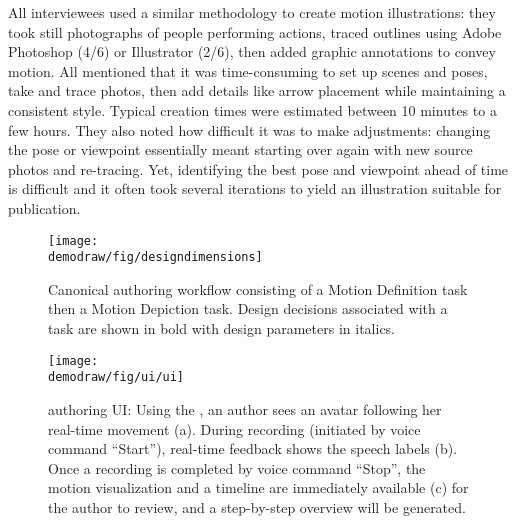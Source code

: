 %
All interviewees used a similar methodology to create motion illustrations: they took still photographs of people performing actions, traced outlines using Adobe Photoshop (4/6) or Illustrator (2/6), then added graphic annotations to convey motion. %
%
All mentioned that it was time-consuming to set up scenes and poses, take and trace photos, then add details like arrow placement while maintaining a consistent style. Typical creation times were estimated between 10 minutes to a few hours.
They also noted how difficult it was to make adjustments: changing the pose or viewpoint essentially meant starting over again with new source photos and re-tracing.
Yet, identifying the best pose and viewpoint ahead of time is difficult and it often took several iterations to yield an illustration suitable for publication.

\begin{figure}[t]
  \centering
  \texttt{[image: \\demodraw/fig/designdimensions]}
  \caption{Canonical authoring workflow consisting of a Motion Definition task then a Motion Depiction task. Design decisions associated with a task are shown in bold with design parameters in italics.}
  \label{fig:designspace}
\end{figure}

\begin{figure*}[!t]
  \centering
  \texttt{[image: \\demodraw/fig/ui/ui]}
  \caption{\systemname{} authoring UI: Using the \phaseI{}, an author sees an avatar following her real-time movement (a). During recording (initiated by voice command ``Start''), real-time feedback shows the speech labels (b). Once a recording is completed by voice command ``Stop'', the motion visualization and a timeline are immediately available (c) for the author to review, and a step-by-step overview will be generated.}
  \label{fig:DemoDrawUI}
\end{figure*}


